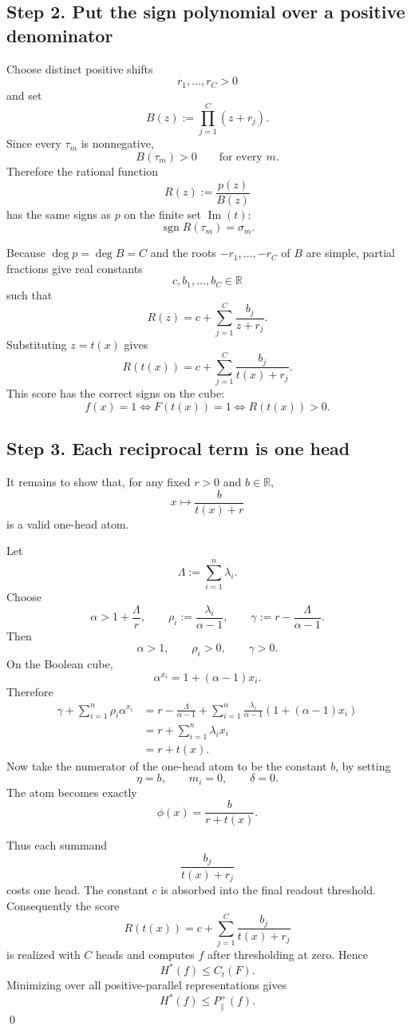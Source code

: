 \documentclass[11pt]{article}
\newcommand{\R}{\mathbb{R}}
\newcommand{\Hstar}{H^{\ast}}
\newcommand{\sgn}{\operatorname{sgn}}
\newcommand{\im}{\operatorname{Im}}
\begin{document}
\subsection*{Step 2. Put the sign polynomial over a positive denominator}

Choose distinct positive shifts
\[
r_1,\ldots,r_C>0
\]
and set
\[
B(z):=\prod_{j=1}^{C}(z+r_j).
\]
Since every $\tau_m$ is nonnegative,
\[
B(\tau_m)>0
\qquad
\text{for every }m.
\]
Therefore the rational function
\[
R(z):=\frac{p(z)}{B(z)}
\]
has the same signs as $p$ on the finite set $\im(t)$:
\[
\sgn R(\tau_m)=\sigma_m.
\]

Because $\deg p=\deg B=C$ and the roots $-r_1,\ldots,-r_C$ of $B$ are simple,
partial fractions give real constants
\[
c,b_1,\ldots,b_C\in\R
\]
such that
\[
R(z)=c+\sum_{j=1}^{C}\frac{b_j}{z+r_j}.
\]
Substituting $z=t(x)$ gives
\[
R(t(x))=
c+\sum_{j=1}^{C}\frac{b_j}{t(x)+r_j}.
\]
This score has the correct signs on the cube:
\[
f(x)=1
\iff
F(t(x))=1
\iff
R(t(x))>0.
\]

\subsection*{Step 3. Each reciprocal term is one head}

It remains to show that, for any fixed $r>0$ and $b\in\R$,
\[
x\longmapsto \frac{b}{t(x)+r}
\]
is a valid one-head atom.

Let
\[
\Lambda:=\sum_{i=1}^{n}\lambda_i.
\]
Choose
\[
\alpha>1+\frac{\Lambda}{r},
\qquad
\rho_i:=\frac{\lambda_i}{\alpha-1},
\qquad
\gamma:=r-\frac{\Lambda}{\alpha-1}.
\]
Then
\[
\alpha>1,\qquad \rho_i>0,\qquad \gamma>0.
\]
On the Boolean cube,
\[
\alpha^{x_i}=1+(\alpha-1)x_i.
\]
Therefore
\[
\begin{aligned}
\gamma+\sum_{i=1}^{n}\rho_i\alpha^{x_i}
&=
r-\frac{\Lambda}{\alpha-1}
+\sum_{i=1}^{n}\frac{\lambda_i}{\alpha-1}
\left(1+(\alpha-1)x_i\right)\\
&=
r+\sum_{i=1}^{n}\lambda_i x_i\\
&=
r+t(x).
\end{aligned}
\]
Now take the numerator of the one-head atom to be the constant $b$, by setting
\[
\eta=b,\qquad m_i=0,\qquad \delta=0.
\]
The atom becomes exactly
\[
\phi(x)=\frac{b}{r+t(x)}.
\]

Thus each summand
\[
\frac{b_j}{t(x)+r_j}
\]
costs one head.  The constant $c$ is absorbed into the final readout threshold.
Consequently the score
\[
R(t(x))=
c+\sum_{j=1}^{C}\frac{b_j}{t(x)+r_j}
\]
is realized with $C$ heads and computes $f$ after thresholding at zero.  Hence
\[
\Hstar(f)\leq C_t(F).
\]
Minimizing over all positive-parallel representations gives
\[
\Hstar(f)\leq P_{\parallel}^{+}(f).
\]
\qed
\end{document}
